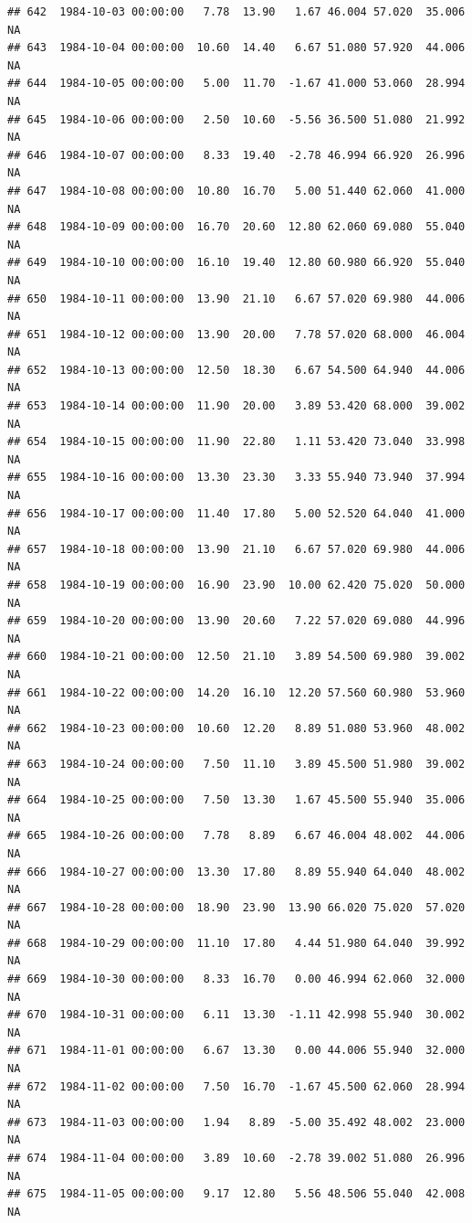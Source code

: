 \documentclass{article}\usepackage{graphicx, color}
\makeatletter
\newenvironment{kframe}{%
 \def\at@end@of@kframe{}%
 \ifinner\ifhmode%
  \def\at@end@of@kframe{\end{minipage}}%
  \begin{minipage}{\columnwidth}%
 \fi\fi%
 \def\FrameCommand##1{\hskip\@totalleftmargin \hskip-\fboxsep
 \colorbox{shadecolor}{##1}\hskip-\fboxsep
     \hskip-\linewidth \hskip-\@totalleftmargin \hskip\columnwidth}%
 \MakeFramed {\advance\hsize-\width
   \@totalleftmargin\z@ \linewidth\hsize
   \@setminipage}}%
 {\par\unskip\endMakeFramed%
 \at@end@of@kframe}
\newenvironment{knitrout}{}{} %
\makeatother
\begin{document}
\begin{knitrout}
\begin{kframe}
\begin{verbatim}
## 642  1984-10-03 00:00:00   7.78  13.90   1.67 46.004 57.020  35.006     NA
## 643  1984-10-04 00:00:00  10.60  14.40   6.67 51.080 57.920  44.006     NA
## 644  1984-10-05 00:00:00   5.00  11.70  -1.67 41.000 53.060  28.994     NA
## 645  1984-10-06 00:00:00   2.50  10.60  -5.56 36.500 51.080  21.992     NA
## 646  1984-10-07 00:00:00   8.33  19.40  -2.78 46.994 66.920  26.996     NA
## 647  1984-10-08 00:00:00  10.80  16.70   5.00 51.440 62.060  41.000     NA
## 648  1984-10-09 00:00:00  16.70  20.60  12.80 62.060 69.080  55.040     NA
## 649  1984-10-10 00:00:00  16.10  19.40  12.80 60.980 66.920  55.040     NA
## 650  1984-10-11 00:00:00  13.90  21.10   6.67 57.020 69.980  44.006     NA
## 651  1984-10-12 00:00:00  13.90  20.00   7.78 57.020 68.000  46.004     NA
## 652  1984-10-13 00:00:00  12.50  18.30   6.67 54.500 64.940  44.006     NA
## 653  1984-10-14 00:00:00  11.90  20.00   3.89 53.420 68.000  39.002     NA
## 654  1984-10-15 00:00:00  11.90  22.80   1.11 53.420 73.040  33.998     NA
## 655  1984-10-16 00:00:00  13.30  23.30   3.33 55.940 73.940  37.994     NA
## 656  1984-10-17 00:00:00  11.40  17.80   5.00 52.520 64.040  41.000     NA
## 657  1984-10-18 00:00:00  13.90  21.10   6.67 57.020 69.980  44.006     NA
## 658  1984-10-19 00:00:00  16.90  23.90  10.00 62.420 75.020  50.000     NA
## 659  1984-10-20 00:00:00  13.90  20.60   7.22 57.020 69.080  44.996     NA
## 660  1984-10-21 00:00:00  12.50  21.10   3.89 54.500 69.980  39.002     NA
## 661  1984-10-22 00:00:00  14.20  16.10  12.20 57.560 60.980  53.960     NA
## 662  1984-10-23 00:00:00  10.60  12.20   8.89 51.080 53.960  48.002     NA
## 663  1984-10-24 00:00:00   7.50  11.10   3.89 45.500 51.980  39.002     NA
## 664  1984-10-25 00:00:00   7.50  13.30   1.67 45.500 55.940  35.006     NA
## 665  1984-10-26 00:00:00   7.78   8.89   6.67 46.004 48.002  44.006     NA
## 666  1984-10-27 00:00:00  13.30  17.80   8.89 55.940 64.040  48.002     NA
## 667  1984-10-28 00:00:00  18.90  23.90  13.90 66.020 75.020  57.020     NA
## 668  1984-10-29 00:00:00  11.10  17.80   4.44 51.980 64.040  39.992     NA
## 669  1984-10-30 00:00:00   8.33  16.70   0.00 46.994 62.060  32.000     NA
## 670  1984-10-31 00:00:00   6.11  13.30  -1.11 42.998 55.940  30.002     NA
## 671  1984-11-01 00:00:00   6.67  13.30   0.00 44.006 55.940  32.000     NA
## 672  1984-11-02 00:00:00   7.50  16.70  -1.67 45.500 62.060  28.994     NA
## 673  1984-11-03 00:00:00   1.94   8.89  -5.00 35.492 48.002  23.000     NA
## 674  1984-11-04 00:00:00   3.89  10.60  -2.78 39.002 51.080  26.996     NA
## 675  1984-11-05 00:00:00   9.17  12.80   5.56 48.506 55.040  42.008     NA

\end{verbatim}
\end{kframe}
\end{knitrout}
\end{document}
